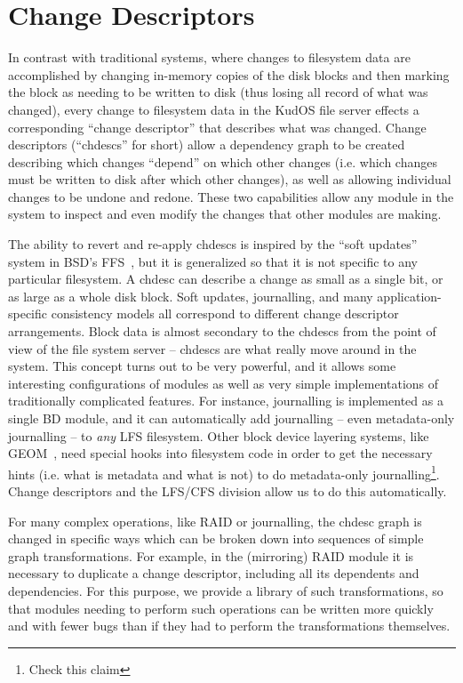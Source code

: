 \section{Change Descriptors}
\label{sec:chdescs}

In contrast with traditional systems, where changes to filesystem data are
accomplished by changing in-memory copies of the disk blocks and then marking
the block as needing to be written to disk (thus losing all record of what was
changed), every change to filesystem data in the KudOS file server effects a
corresponding ``change descriptor'' that describes what was changed. Change
descriptors (``chdescs'' for short) allow a dependency graph to be created
describing which changes ``depend'' on which other changes (i.e. which changes
must be written to disk after which other changes), as well as allowing
individual changes to be undone and redone. These two capabilities allow any
module in the system to inspect and even modify the changes that other modules
are making.

The ability to revert and re-apply chdescs is inspired by the ``soft updates''
system in BSD's FFS~\cite{ganger00soft}, but it is generalized so that it is not
specific to any particular filesystem. A chdesc can describe a change as small
as a single bit, or as large as a whole disk block. Soft updates, journalling,
and many application-specific consistency models all correspond to different
change descriptor arrangements. Block data is almost secondary to the chdescs
from the point of view of the file system server -- chdescs are what really move
around in the system. This concept turns out to be very powerful, and it allows
some interesting configurations of modules as well as very simple
implementations of traditionally complicated features. For instance, journalling
is implemented as a single BD module, and it can automatically add journalling
-- even metadata-only journalling -- to {\it any} LFS filesystem. Other block
device layering systems, like GEOM~\cite{geom}, need special hooks into
filesystem code in order to get the necessary hints (i.e. what is metadata and
what is not) to do metadata-only journalling\footnote{Check this claim}. Change
descriptors and the LFS/CFS division allow us to do this automatically.

For many complex operations, like RAID or journalling, the chdesc graph is
changed in specific ways which can be broken down into sequences of simple graph
transformations. For example, in the (mirroring) RAID module it is necessary to
duplicate a change descriptor, including all its dependents and dependencies.
For this purpose, we provide a library of such transformations, so that modules
needing to perform such operations can be written more quickly and with fewer
bugs than if they had to perform the transformations themselves.
